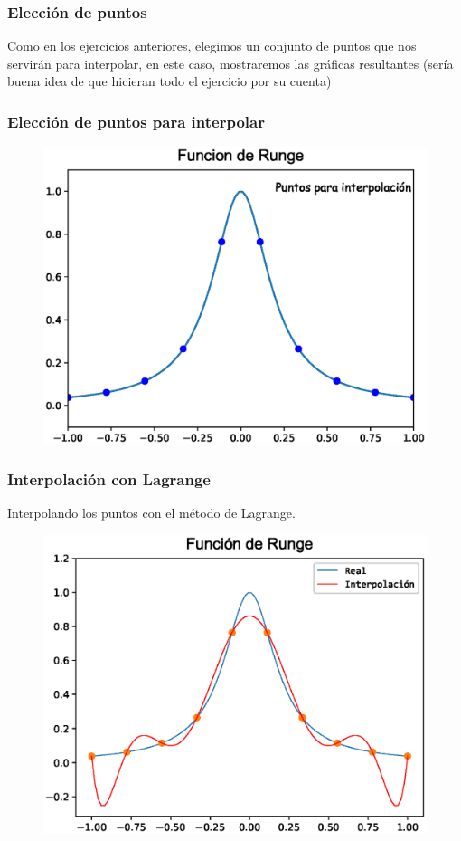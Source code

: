 \begin{frame}
\frametitle{Elección de puntos}
Como en los ejercicios anteriores, elegimos un conjunto de puntos que nos servirán para interpolar, en este caso, mostraremos las gráficas resultantes (sería buena idea de que hicieran todo el ejercicio por su cuenta)
\end{frame}
\begin{frame}
\frametitle{Elección de puntos para interpolar}
\begin{figure}
	\centering
	\includegraphics[scale=0.5]{Imagenes/Funcion_Runge_2017_01.eps} 
\end{figure}
\end{frame}
\begin{frame}
\frametitle{Interpolación con Lagrange}
Interpolando los puntos con el método de Lagrange.
\begin{figure}
	\centering
	\includegraphics[scale=0.5]{Imagenes/Funcion_Runge_2017_02.eps} 
\end{figure}
\end{frame}
